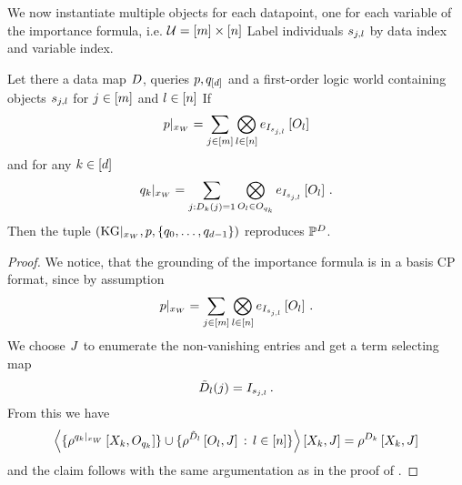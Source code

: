 %
We now instantiate multiple objects for each datapoint, one for each variable of the importance formula, i.e. $\mathcal{U}=[m]\times[n]$
Label individuals $s_{j,l}$ by data index and variable index.

\begin{lemma}
    Let there a data map $D$, queries $p,q_{[d]}$ and a first-order logic world containing objects $s_{j,l}$ for $j\in[m]$ and $l\in[n]$
    If
    \begin{align*}
        {p}|_{x_{W}}
        = \sum_{j\in[m]} \bigotimes_{l\in[n]} e_{I_{s_{j,l}}}\left[O_{l}\right]
    \end{align*}
    and for any $k\in[d]$
    \begin{align*}
        {q_{k}}|_{x_{W}}
        = \sum_{j : D_{k}(j)=1} \bigotimes_{O_{l} \in O_{q_{k}}}
        e_{I_{s_{j,l}}}\left[O_{l}\right] \, .
    \end{align*}
    Then the tuple $(\mathrm{KG}|_{x_{W}},p,\{q_{0},\ldots,q_{d-1}\})$ reproduces $\mathbb{P}^{D}$.
\end{lemma}
\begin{proof}
    We notice, that the grounding of the importance formula is in a basis CP format, since by assumption
    \begin{align*}
        {p}|_{x_{W}}
        = \sum_{j\in[m]} \bigotimes_{l\in[n]} e_{I_{s_{j,l}}}\left[O_{l}\right] \, .
    \end{align*}
    We choose $J$ to enumerate the non-vanishing entries and get a term selecting map
    \begin{align*}
        \tilde{D}_{l}(j) = I_{s_{j,l}} \, .
    \end{align*}
    From this we have
    \begin{align*}
        \left\langle 
        \{\rho^{{q_{k}}|_{x_{W}}}\left[X_{k},O_{q_{k}}\right]\} \cup
        \{\rho^{\tilde{D}_{l}}\left[O_{l},J\right] \, : \, l\in[n]\}
        \right\rangle \left[ X_{k},J \right]
        = \rho^{D_{k}}\left[X_{k},J\right]
    \end{align*}
    and the claim follows with the same argumentation as in the proof of .
\end{proof}


